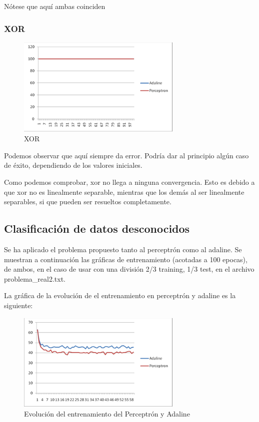 \documentclass[12pt]{article}
\begin{document}
Nótese que aquí ambas coinciden
\subsubsection*{XOR}
\begin{figure}[h!]
    \label{fig:fig5}
  \centering
       \includegraphics[width=0.7\textwidth]{recursos/fig5}
    \caption{XOR}
\end{figure} 

Podemos observar que aquí siempre da error. Podría dar al principio algún caso de éxito, dependiendo de los valores iniciales.

Como podemos comprobar, xor no llega a ninguna convergencia. Esto es debido a que xor no es linealmente separable, mientras que los demás al ser linealmente separables, si que pueden ser resueltos completamente.

\subsection{Clasificación de datos desconocidos}
Se ha aplicado el problema propuesto tanto al perceptrón como al adaline. Se muestran a continuación las gráficas de entrenamiento (acotadas a 100 epocas), de ambos, en el caso de usar con una división 2/3 training, 1/3 test, en el archivo problema\_real2.txt.

La gráfica de la evolución de el entrenamiento en perceptrón y adaline es la siguiente:
\begin{figure}[h!]
    \label{fig:fig6}
  \centering
       \includegraphics[width=0.7\textwidth]{recursos/fig6}
    \caption{Evolución del entrenamiento del Perceptrón y Adaline}
\end{figure} 
\end{document}
